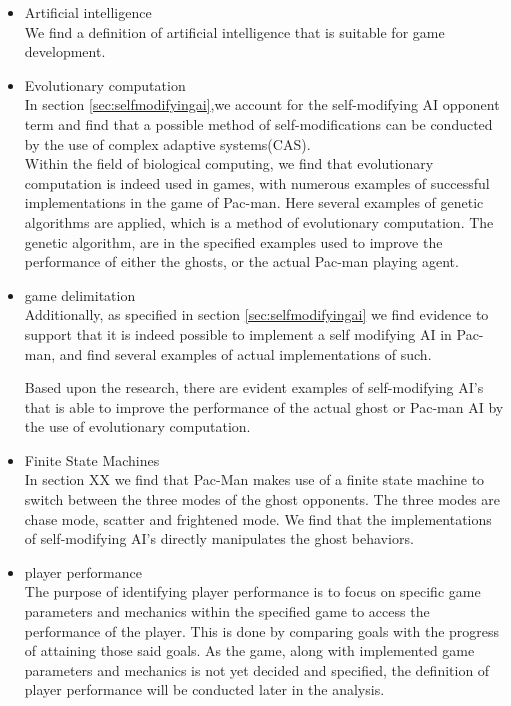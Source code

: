 \begin{itemize}
\item Artificial intelligence\\
We find a definition of artificial intelligence that is suitable for game development.

\item Evolutionary computation\\
In section \ref{sec:selfmodifyingai},we account for the self-modifying AI opponent term and find that a possible method of self-modifications can be conducted by the use of complex adaptive systems(CAS).\\

Within the field of biological computing, we find that evolutionary computation is indeed used in games, with numerous examples of successful implementations in the game of Pac-man. Here several examples of genetic algorithms are applied, which is a method of evolutionary computation. The genetic algorithm, are in the specified examples used to improve the performance of either the ghosts, or the actual Pac-man playing agent.

\item game delimitation\\
Additionally, as specified in section \ref{sec:selfmodifyingai} we find evidence to support that it is indeed possible to implement a self modifying AI in Pac-man, and find several examples of actual implementations of such.

Based upon the research, there are evident examples of self-modifying AI's that is able to improve the performance of the actual ghost or Pac-man AI by the use of evolutionary computation.

\item Finite State Machines\\
In section XX we find that Pac-Man makes use of a finite state machine to switch between the three modes of the ghost opponents. The three modes are chase mode, scatter and frightened mode. We find that the implementations of self-modifying AI's directly manipulates the ghost behaviors.

\item player performance\\
The purpose of identifying player performance is to focus on specific game parameters and mechanics within the specified game to access the performance of the player. This is done by comparing goals with the progress of attaining those said goals. As the game, along with implemented game parameters and mechanics is not yet decided and specified, the definition of player performance will be conducted later in the analysis.
\end{itemize}

